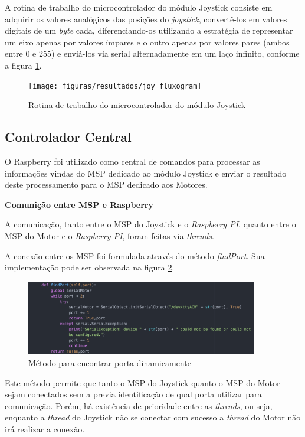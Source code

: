   A rotina de trabalho do microcontrolador do módulo Joystick consiste em adquirir os valores analógicos das posições do \textit{joystick}, convertê-los em valores digitais de um \textit{byte} cada, diferenciando-os utilizando a estratégia de representar um eixo apenas por valores ímpares e o outro apenas por valores pares (ambos entre 0 e 255) e enviá-los via serial alternadamente em um laço infinito, conforme a figura \ref{fig:joy_fluxogram}.

  \begin{figure}[!htb]
  \centering
  \texttt{[image: figuras/resultados/joy\_fluxogram]}
  \caption{Rotina de trabalho do microcontrolador do módulo Joystick}
  \label{fig:joy_fluxogram}
  \end{figure}

\subsection{Controlador Central}

  O Raspberry foi utilizado como central de comandos para processar as informações vindas do MSP dedicado ao módulo Joystick e enviar o resultado deste processamento para o MSP dedicado aos Motores.

  \textbf{Comunição entre MSP e Raspberry}

  A comunicação, tanto entre o MSP do Joystick e o \textit{Raspberry PI}, quanto entre o MSP do Motor e o \textit{Raspberry PI}, foram feitas via \textit{threads}.

  A conexão entre os MSP foi formulada através do método \textit{findPort}. Sua implementação pode ser observada na figura \ref{fig:find_port_method}.

  \begin{figure}[!htb]
    \centering
    \includegraphics[width=0.9\textwidth]{figuras/resultados/find_port_method}
    \caption{Método para encontrar porta dinamicamente}
    \label{fig:find_port_method}
  \end{figure}

  Este método permite que tanto o MSP do Joystick quanto o MSP do Motor sejam conectados sem a previa identificação de qual porta utilizar para comunicação. Porém, há existência de prioridade entre as \textit{threads}, ou seja, enquanto a \textit{thread} do Joystick não se conectar com sucesso a \textit{thread} do Motor não irá realizar a conexão.

